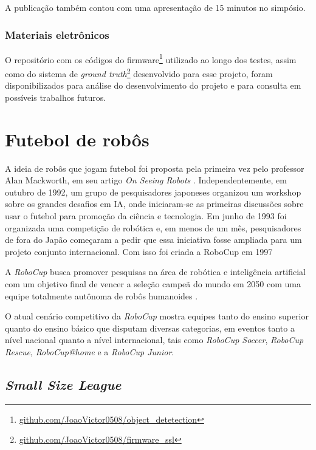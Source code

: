 \documentclass[acronym, symbols, table]{fei}
\begin{document}
			A publicação também contou com uma apresentação de 15 minutos no simpósio.
			
		\subsection{Materiais eletrônicos}
		
			O repositório com os códigos do firmware\footnote{\href{https://github.com/JoaoVictor0508/object_detetection/tree/main}{github.com/JoaoVictor0508/object\_detetection}} utilizado ao longo dos testes, assim como do sistema de \textit{ground truth}\footnote{\href{https://github.com/JoaoVictor0508/firmware_ssl}{github.com/JoaoVictor0508/firmware\_ssl}} desenvolvido para esse projeto, foram disponibilizados para análise do desenvolvimento do projeto e para consulta em possíveis trabalhos futuros.

	\chapter{Futebol de robôs}\label{sec:chapter_futebol_robos}
	
		A ideia de robôs que jogam futebol foi proposta pela primeira vez pelo professor Alan Mackworth, em seu artigo \textit{On Seeing Robots} \cite{OnSeeingRobots}. Independentemente, em outubro de 1992, um grupo de pesquisadores japoneses organizou um workshop sobre os grandes desafios em IA, onde iniciaram-se as primeiras discussões sobre usar o futebol para promoção da ciência e tecnologia. Em junho de 1993 foi organizada uma competição de robótica e, em menos de um mês, pesquisadores de fora do Japão começaram a pedir que essa iniciativa fosse ampliada para um projeto conjunto internacional. Com isso foi criada a RoboCup em 1997 \cite{RoboCup}
		
		A \textit{RoboCup} busca promover pesquisas na área de robótica e inteligência artificial com um objetivo final de vencer a seleção campeã do mundo em 2050 com uma equipe totalmente autônoma de robôs humanoides \cite{RoboCup}.
		
		O atual cenário competitivo da \textit{RoboCup} mostra equipes tanto do ensino superior quanto do ensino básico que disputam diversas categorias, em eventos tanto a nível nacional quanto a nível internacional, tais como \textit{RoboCup Soccer}, \textit{RoboCup Rescue}, \textit{RoboCup@home} e a \textit{RoboCup Junior}.
	
	\section{\textit{Small Size League}} \label{sec:small_size_league}
	
\end{document}
